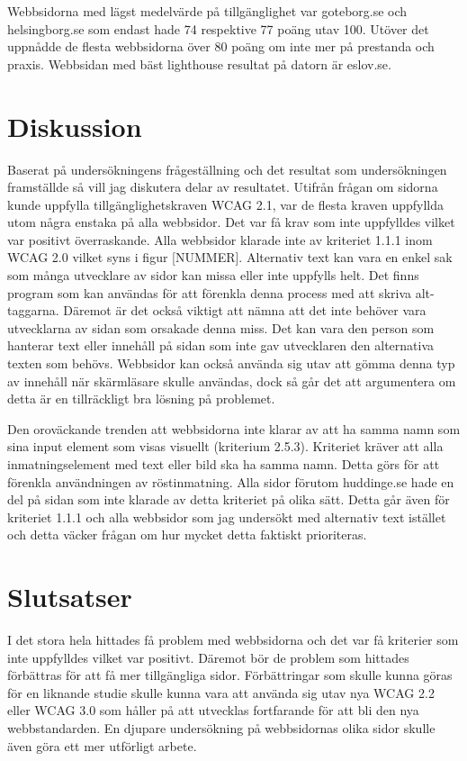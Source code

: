 \documentclass[11p]{article}
\begin{document}
    Webbsidorna med lägst medelvärde på tillgänglighet var goteborg.se och helsingborg.se som endast hade 74 respektive 77 poäng utav 100.
    Utöver det uppnådde de flesta webbsidorna över 80 poäng om inte mer på prestanda och praxis.
    Webbsidan med bäst lighthouse resultat på datorn är eslov.se.

    \section{Diskussion}
    Baserat på undersökningens frågeställning och det resultat som undersökningen framställde så vill jag diskutera delar av resultatet.
    Utifrån frågan om sidorna kunde uppfylla tillgänglighetskraven WCAG 2.1, var de flesta kraven uppfyllda utom några enstaka på alla webbsidor.
    Det var få krav som inte uppfylldes vilket var positivt överraskande.
    Alla webbsidor klarade inte av kriteriet 1.1.1 inom WCAG 2.0 vilket syns i figur [NUMMER].
    Alternativ text kan vara en enkel sak som många utvecklare av sidor kan missa eller inte uppfylls helt.
    Det finns program som kan användas för att förenkla denna process med att skriva alt-taggarna.
    Däremot är det också viktigt att nämna att det inte behöver vara utvecklarna av sidan som orsakade denna miss.
    Det kan vara den person som hanterar text eller innehåll på sidan som inte gav utvecklaren den alternativa texten som behövs.
    Webbsidor kan också använda sig utav att gömma denna typ av innehåll när skärmläsare skulle användas, dock så går det att argumentera om detta är en tillräckligt bra lösning på problemet.

    Den oroväckande trenden att webbsidorna inte klarar av att ha samma namn som sina input element som visas visuellt (kriterium 2.5.3).
    Kriteriet kräver att alla inmatningselement med text eller bild ska ha samma namn.
    Detta görs för att förenkla användningen av röstinmatning.
    Alla sidor förutom huddinge.se hade en del på sidan som inte klarade av detta kriteriet på olika sätt.
    Detta går även för kriteriet 1.1.1 och alla webbsidor som jag undersökt med alternativ text istället och detta väcker frågan om hur mycket detta faktiskt prioriteras.
    
    \section{Slutsatser}
    I det stora hela hittades få problem med webbsidorna och det var få kriterier som inte uppfylldes vilket var positivt.
    Däremot bör de problem som hittades förbättras för att få mer tillgängliga sidor.
    Förbättringar som skulle kunna göras för en liknande studie skulle kunna vara att använda sig utav nya WCAG 2.2 eller WCAG 3.0 som håller på att utvecklas fortfarande för att bli den nya webbstandarden.
    En djupare undersökning på webbsidornas olika sidor skulle även göra ett mer utförligt arbete.


    \printbibliography
\end{document}
